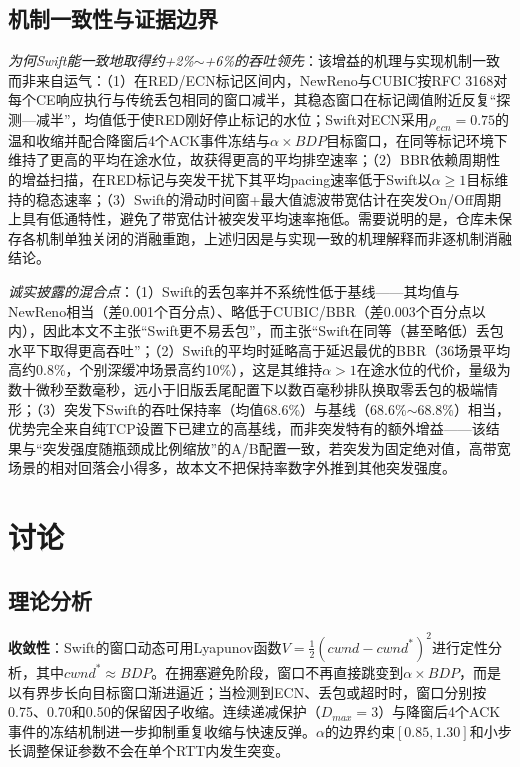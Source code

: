 \documentclass[10pt,twocolumn]{article}
\begin{document}
\subsection{机制一致性与证据边界}

\textit{为何Swift能一致地取得约+2\%$\sim$+6\%的吞吐领先}：该增益的机理与实现机制一致而非来自运气：（1）在RED/ECN标记区间内，NewReno与CUBIC按RFC 3168对每个CE响应执行与传统丢包相同的窗口减半，其稳态窗口在标记阈值附近反复“探测—减半”，均值低于使RED刚好停止标记的水位；Swift对ECN采用$\rho_{ecn}=0.75$的温和收缩并配合降窗后4个ACK事件冻结与$\alpha \times BDP$目标窗口，在同等标记环境下维持了更高的平均在途水位，故获得更高的平均排空速率；（2）BBR依赖周期性的增益扫描，在RED标记与突发干扰下其平均pacing速率低于Swift以$\alpha\ge 1$目标维持的稳态速率；（3）Swift的滑动时间窗+最大值滤波带宽估计在突发On/Off周期上具有低通特性，避免了带宽估计被突发平均速率拖低。需要说明的是，仓库未保存各机制单独关闭的消融重跑，上述归因是与实现一致的机理解释而非逐机制消融结论。

\textit{诚实披露的混合点}：（1）Swift的丢包率并不系统性低于基线——其均值与NewReno相当（差0.001个百分点）、略低于CUBIC/BBR（差0.003个百分点以内），因此本文不主张“Swift更不易丢包”，而主张“Swift在同等（甚至略低）丢包水平下取得更高吞吐”；（2）Swift的平均时延略高于延迟最优的BBR（36场景平均高约0.8\%，个别深缓冲场景高约10\%），这是其维持$\alpha>1$在途水位的代价，量级为数十微秒至数毫秒，远小于旧版丢尾配置下以数百毫秒排队换取零丢包的极端情形；（3）突发下Swift的吞吐保持率（均值68.6\%）与基线（68.6\%$\sim$68.8\%）相当，优势完全来自纯TCP设置下已建立的高基线，而非突发特有的额外增益——该结果与“突发强度随瓶颈成比例缩放”的A/B配置一致，若突发为固定绝对值，高带宽场景的相对回落会小得多，故本文不把保持率数字外推到其他突发强度。

\section{讨论}
\label{sec:discussion}

\subsection{理论分析}

\textbf{收敛性}：Swift的窗口动态可用Lyapunov函数$V = \frac{1}{2}(cwnd - cwnd^*)^2$进行定性分析，其中$cwnd^* \approx BDP$。在拥塞避免阶段，窗口不再直接跳变到$\alpha \times BDP$，而是以有界步长向目标窗口渐进逼近；当检测到ECN、丢包或超时时，窗口分别按0.75、0.70和0.50的保留因子收缩。连续递减保护（$D_{max}=3$）与降窗后4个ACK事件的冻结机制进一步抑制重复收缩与快速反弹。$\alpha$的边界约束$[0.85,1.30]$和小步长调整保证参数不会在单个RTT内发生突变。
\end{document}
